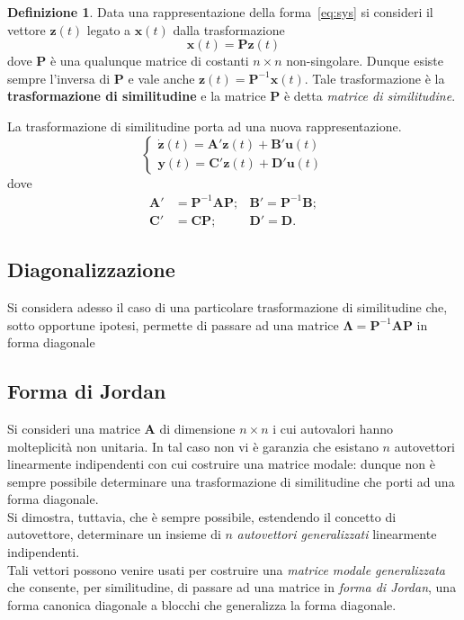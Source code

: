 \documentclass[a4paper]{article}
\renewcommand{\vec}{\bm}
\theoremstyle{definition}
\newtheorem{defn}{Definizione}[subsection]
\begin{document}
			\begin{defn}
				Data una rappresentazione della forma~\eqref{eq:sys} si consideri il vettore $ \vec{z}(t) $ legato a $ \vec{x}(t) $ dalla trasformazione
				\[
					\vec{x}(t) = \vec{P}\vec{z}(t)
				\]
				dove $ \vec{P} $ è una qualunque matrice di costanti $ n\times n $ non-singolare. Dunque esiste sempre l'inversa di $ \vec{P} $ e vale anche $ \vec{z}(t) = \vec{P}^{-1}\vec{x}(t) $. Tale trasformazione è la \textbf{trasformazione di similitudine} e la matrice $ \vec{P} $ è detta \textit{matrice di similitudine}.
			\end{defn}
			La trasformazione di similitudine porta ad una nuova rappresentazione.
			\[
				\begin{cases}
					\vec{\dot{z}}(t) = \vec{A'}\vec{z}(t) + \vec{B'}\vec{u}(t) \\
					\vec{y}(t) = \vec{C'}\vec{z}(t) + \vec{D'}\vec{u}(t)
				\end{cases}
			\]
			dove
			\begin{align*}
				\vec{A'} &= \vec{P}^{-1}\vec{A}\vec{P}; &\vec{B'} = \vec{P}^{-1}\vec{B};\\
				\vec{C'} &= \vec{C}\vec{P}; &\vec{D'} = \vec{D}.
			\end{align*}
			 
		\subsection{Diagonalizzazione}
			Si considera adesso il caso di una particolare trasformazione di similitudine che,
			sotto opportune ipotesi, permette di passare ad una matrice $ \vec{\Lambda} = \vec{P}^{-1}\vec{A}\vec{P} $ in forma diagonale
			
		\subsection{Forma di Jordan}
			Si consideri una matrice $ \vec{A} $ di dimensione $ n\times n $ i cui autovalori hanno molteplicità
			non unitaria. In tal caso non vi è garanzia che esistano $ n $ autovettori linearmente indipendenti con cui costruire una matrice modale: dunque non è sempre possibile determinare una trasformazione di similitudine che porti ad una forma diagonale.\\
			Si dimostra, tuttavia, che è sempre possibile, estendendo il concetto di autovettore, determinare un insieme di $ n $ \textit{autovettori generalizzati} linearmente indipendenti.\\
			Tali vettori possono venire usati per costruire una \textit{matrice modale generalizzata} che 
			consente, per similitudine, di passare ad una matrice in \textit{forma di Jordan}, una forma
			canonica diagonale a blocchi che generalizza la forma diagonale.
			
\end{document}

